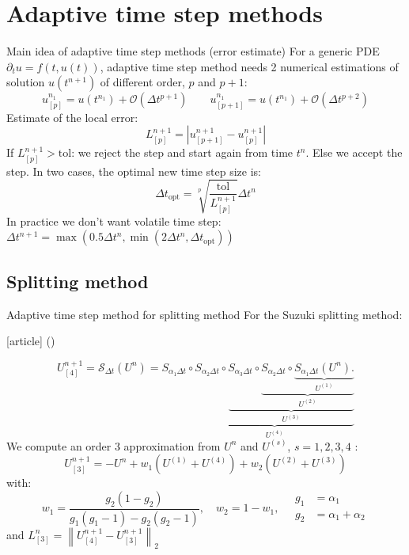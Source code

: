 \documentclass{beamer}
\newcommand{\customcite}[1]{\citeauthor{#1} (\citeyear{#1})}
\begin{document}
\section{Adaptive time step methods}
\begin{frame}{Main idea of adaptive time step methods (error estimate)}
  For a generic PDE $\partial_t u = f(t,u(t))$, adaptive time step method needs 2 numerical estimations of solution $u(t^{n+1})$ of different order, $p$ and $p+1$:
  $$
    u^{n_1}_{[p]} = u(t^{n_1}) + \mathcal{O}\left(\Delta t^{p+1}\right) \qquad u^{n_1}_{[p+1]} = u(t^{n_1}) + \mathcal{O}\left(\Delta t^{p+2}\right)
  $$
  Estimate of the local error:
  $$
    L^{n+1}_{[p]} = \left| u^{n+1}_{[p+1]} - u^{n+1}_{[p]} \right|
  $$
  If $L^{n+1}_{[p]} > \text{tol}$: we reject the step and  start again from time $t^n$. Else we accept the step. In two cases, the optimal new time step size is:
  $$
    \Delta t_\text{opt} = \sqrt[p]{\frac{\text{tol}}{ L^{n+1}_{[p]}}}\Delta t^n
  $$
  In practice we don't want volatile time step: $\Delta t^{n+1} = \max\left(0.5\Delta t^n,\min\left(2\Delta t^n,\Delta t_\text{opt}\right)\right)$
\end{frame}

\subsection{Splitting method}
\begin{frame}{Adaptive time step method for splitting method}
  For the Suzuki splitting method:
  \begin{thebibliography}{9}
    [article]
     \customcite{Blanes:2019}
  \end{thebibliography}
  $$
    U^{n+1}_{[4]} = \mathcal{S}_{\Delta t}(U^n)
      = S_{\alpha_1\Delta t}
        \circ \underbrace{ S_{\alpha_2\Delta t}
        \circ \underbrace{ S_{\alpha_3\Delta t}
        \circ \underbrace{ S_{\alpha_2\Delta t}
        \circ \underbrace{ S_{\alpha_1\Delta t} (U^n). }_{U^{(1)}}
                                                      }_{U^{(2)}}
                                                      }_{U^{(3)}}
                                                      }_{U^{(4)}}
  $$
  We compute an order 3 approximation from $U^n$ and $U^{(s)}$, $s=1,2,3,4$ :
  $$
    U^{n+1}_{[3]} = -U^n + w_1(U^{(1)}+U^{(4)}) + w_2(U^{(2)}+U^{(3)})
  $$
  with:
  $$
    w_1 = \frac{g_2(1-g_2)}{g_1(g_1-1)-g_2(g_2-1)},\quad w_2 = 1-w_1, \quad \begin{aligned}g_1 &= \alpha_1\\ g_2&=\alpha_1+\alpha_2\end{aligned}
  $$
  and $L^{n}_{[3]} = \left\| U^{n+1}_{[4]} - U^{n+1}_{[3]} \right\|_2$
\end{frame}
\end{document}
